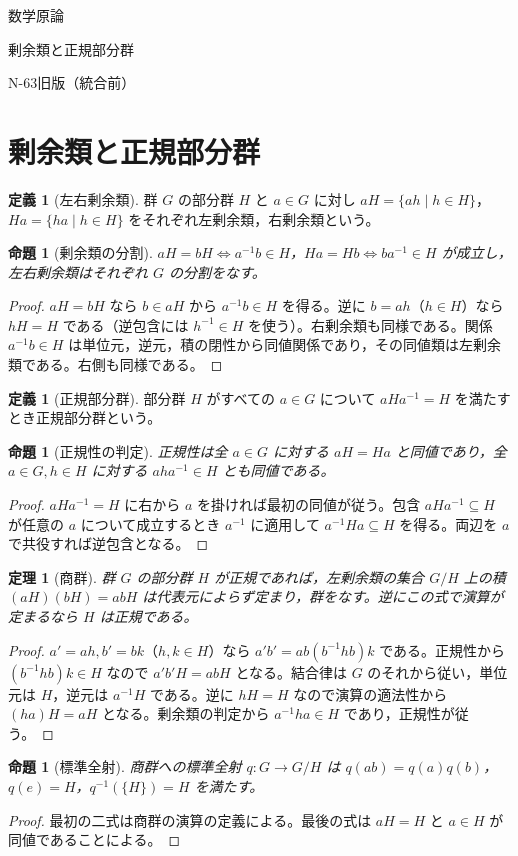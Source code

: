 \documentclass[a5paper,10pt,dvipdfmx]{jsarticle}
\theoremstyle{definition}
\newtheorem{defn}[ruledef]{定義}
\theoremstyle{plain}
\newtheorem{prop}[ruledef]{命題}
\newtheorem{thm}[ruledef]{定理}
\begin{document}
\begin{center}
{\small 数学原論}\par\vspace{4mm}
{\LARGE 剰余類と正規部分群}\par\vspace{2mm}
{\small N-63\quad 旧版（統合前）}
\end{center}
\section{剰余類と正規部分群}
\begin{defn}[左右剰余類]\label{k263}
群 $G$ の部分群 $H$ と $a\in G$ に対し $aH=\{ah\mid h\in H\}$，$Ha=\{ha\mid h\in H\}$ をそれぞれ左剰余類，右剰余類という。
\end{defn}
\begin{prop}[剰余類の分割]\label{k264}
$aH=bH\iff a^{-1}b\in H$，$Ha=Hb\iff ba^{-1}\in H$ が成立し，左右剰余類はそれぞれ $G$ の分割をなす。
\end{prop}
\begin{proof}
$aH=bH$ なら $b\in aH$ から $a^{-1}b\in H$ を得る。逆に $b=ah$（$h\in H$）なら $hH=H$ である（逆包含には $h^{-1}\in H$ を使う）。右剰余類も同様である。関係 $a^{-1}b\in H$ は単位元，逆元，積の閉性から同値関係であり，その同値類は左剰余類である。右側も同様である。
\end{proof}
\begin{defn}[正規部分群]\label{k265}
部分群 $H$ がすべての $a\in G$ について $aHa^{-1}=H$ を満たすとき正規部分群という。
\end{defn}
\begin{prop}[正規性の判定]\label{k266}
正規性は全 $a\in G$ に対する $aH=Ha$ と同値であり，全 $a\in G,h\in H$ に対する $aha^{-1}\in H$ とも同値である。
\end{prop}
\begin{proof}
$aHa^{-1}=H$ に右から $a$ を掛ければ最初の同値が従う。包含 $aHa^{-1}\subseteq H$ が任意の $a$ について成立するとき $a^{-1}$ に適用して $a^{-1}Ha\subseteq H$ を得る。両辺を $a$ で共役すれば逆包含となる。
\end{proof}
\begin{thm}[商群]\label{k267}
群 $G$ の部分群 $H$ が正規であれば，左剰余類の集合 $G/H$ 上の積 $(aH)(bH)=abH$ は代表元によらず定まり，群をなす。逆にこの式で演算が定まるなら $H$ は正規である。
\end{thm}
\begin{proof}
$a'=ah,b'=bk$（$h,k\in H$）なら $a'b'=ab(b^{-1}hb)k$ である。正規性から $(b^{-1}hb)k\in H$ なので $a'b'H=abH$ となる。結合律は $G$ のそれから従い，単位元は $H$，逆元は $a^{-1}H$ である。逆に $hH=H$ なので演算の適法性から $(ha)H=aH$ となる。剰余類の判定から $a^{-1}ha\in H$ であり，正規性が従う。
\end{proof}
\begin{prop}[標準全射]\label{k268}
商群への標準全射 $q\colon G\to G/H$ は $q(ab)=q(a)q(b)$，$q(e)=H$，$q^{-1}(\{H\})=H$ を満たす。
\end{prop}
\begin{proof}
最初の二式は商群の演算の定義による。最後の式は $aH=H$ と $a\in H$ が同値であることによる。
\end{proof}
\end{document}
